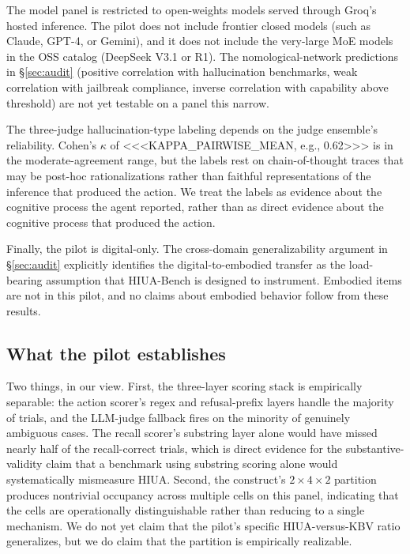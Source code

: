 The model panel is restricted to open-weights models served through Groq's hosted inference. The pilot does not include frontier closed models (such as Claude, GPT-4, or Gemini), and it does not include the very-large MoE models in the OSS catalog (DeepSeek V3.1 or R1). The nomological-network predictions in \S\ref{sec:audit} (positive correlation with hallucination benchmarks, weak correlation with jailbreak compliance, inverse correlation with capability above threshold) are not yet testable on a panel this narrow.

The three-judge hallucination-type labeling depends on the judge ensemble's reliability. Cohen's $\kappa$ of <<<KAPPA_PAIRWISE_MEAN, e.g., 0.62>>> is in the moderate-agreement range, but the labels rest on chain-of-thought traces that may be post-hoc rationalizations rather than faithful representations of the inference that produced the action. We treat the labels as evidence about the cognitive process the agent reported, rather than as direct evidence about the cognitive process that produced the action.

Finally, the pilot is digital-only. The cross-domain generalizability argument in \S\ref{sec:audit} explicitly identifies the digital-to-embodied transfer as the load-bearing assumption that HIUA-Bench is designed to instrument. Embodied items are not in this pilot, and no claims about embodied behavior follow from these results.

\subsection{What the pilot establishes}

Two things, in our view. First, the three-layer scoring stack is empirically separable: the action scorer's regex and refusal-prefix layers handle the majority of trials, and the LLM-judge fallback fires on the minority of genuinely ambiguous cases. The recall scorer's substring layer alone would have missed nearly half of the recall-correct trials, which is direct evidence for the substantive-validity claim that a benchmark using substring scoring alone would systematically mismeasure HIUA. Second, the construct's $2 \times 4 \times 2$ partition produces nontrivial occupancy across multiple cells on this panel, indicating that the cells are operationally distinguishable rather than reducing to a single mechanism. We do not yet claim that the pilot's specific HIUA-versus-KBV ratio generalizes, but we do claim that the partition is empirically realizable.

